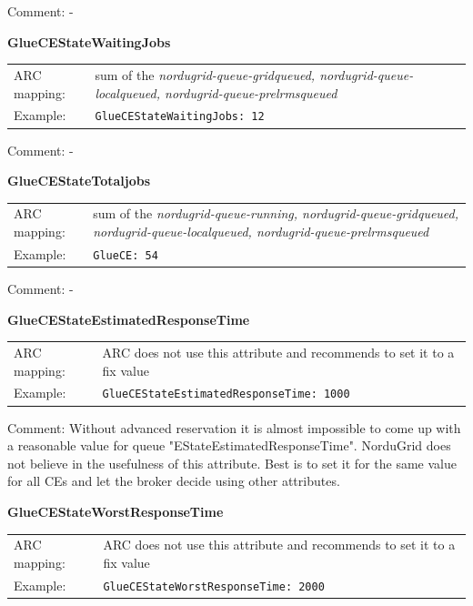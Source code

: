 \documentclass{article}
\begin{document}
Comment: -


\hspace*{0.5cm}
\begin{shaded}
 \textbf{GlueCEStateWaitingJobs} 
\end{shaded}
\begin{tabular}{lp{10cm}}  
  ARC mapping:& sum of the {\it nordugrid-queue-gridqueued,
    nordugrid-queue-localqueued, nordugrid-queue-prelrmsqueued} \\
  Example:& \verb#GlueCEStateWaitingJobs: 12#\\
\end{tabular}

Comment: -


\hspace*{0.5cm}
\begin{shaded}
 \textbf{GlueCEStateTotaljobs} 
\end{shaded}
\begin{tabular}{lp{10cm}}  
  ARC mapping:& sum of the {\it nordugrid-queue-running,
    nordugrid-queue-gridqueued, nordugrid-queue-localqueued,
    nordugrid-queue-prelrmsqueued}\\
  Example:& \verb#GlueCE: 54#\\
\end{tabular}

Comment: -


\hspace*{0.5cm}
\begin{shaded}
 \textbf{GlueCEStateEstimatedResponseTime} 
\end{shaded}
\begin{tabular}{lp{10cm}}  
  ARC mapping:& ARC does not use this attribute and recommends to set it to 
    a fix value\\
  Example:& \verb#GlueCEStateEstimatedResponseTime: 1000#\\
\end{tabular}

Comment: Without advanced reservation it is almost impossible to
come up with a reasonable value for queue "EStateEstimatedResponseTime".
NorduGrid does not believe in the usefulness of this attribute. 
Best is to set it for the same value for all CEs and let the broker decide 
using other attributes.


\hspace*{0.5cm}
\begin{shaded}
 \textbf{GlueCEStateWorstResponseTime} 
\end{shaded}
\begin{tabular}{lp{10cm}}  
  ARC mapping:& ARC does not use this attribute and recommends to set it to 
    a fix value\\
  Example:& \verb#GlueCEStateWorstResponseTime: 2000#\\
\end{tabular}
\end{document}

